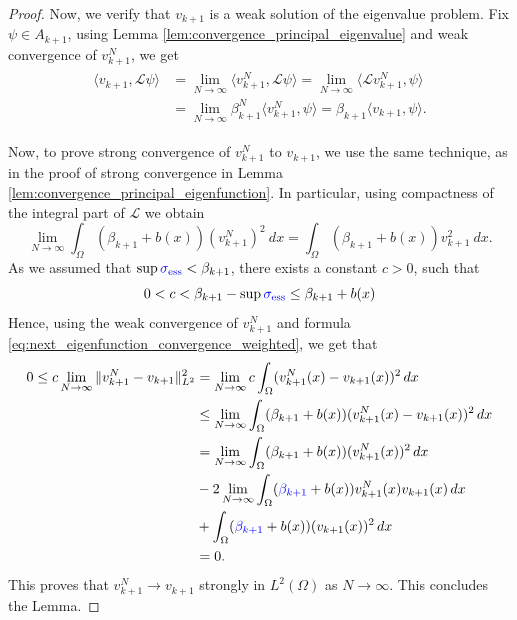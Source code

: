 \documentclass[12pt, a4paper]{article}
\newcommand{\revision}[1]{\textcolor{blue}{#1}}
\theoremstyle{break}
\theoremstyle{break}
\theoremstyle{break}
\theoremstyle{break}
\theoremstyle{break}
\theoremstyle{break}
\theoremstyle{break}
\theoremstyle{break}
\theoremstyle{break}
\begin{document}
\begin{proof}
    Now, we verify that $v_{k+1}$ is a weak solution of the eigenvalue problem. Fix $\psi \in A_{k+1}$, using Lemma \ref{lem:convergence_principal_eigenvalue} and weak convergence of $v_{k+1}^N$, we get
    \begin{align}
        \begin{split}
            \langle v_{k+1}, \mathcal{L} \psi \rangle
            &= \lim_{N \to \infty} \langle v_{k+1}^N, \mathcal{L} \psi \rangle = \lim_{N \to \infty} \langle \mathcal{L} v_{k+1}^N, \psi \rangle \\
            &= \lim_{N \to \infty} \beta_{k+1}^N \langle v_{k+1}^N, \psi \rangle = \beta_{k+1} \langle v_{k+1}, \psi \rangle.
        \end{split}
    \end{align}
    
    Now, to prove strong convergence of $v_{k+1}^N$ to $v_{k+1}$, we use the same technique, as in the proof of strong convergence in Lemma \ref{lem:convergence_principal_eigenfunction}. In particular, using compactness of the integral part of $\mathcal{L}$ we obtain
    \begin{equation}
        \label{eq:next_eigenfunction_convergence_weighted}
        \lim_{N \rightarrow \infty} \int_\Omega (\beta_{k+1} + b(x)) (v_{k+1}^N)^2\:dx = \int_\Omega (\beta_{k+1} + b(x))v_{k+1}^2\:dx.
    \end{equation}
    As we assumed that $\sup \revision{\sigma_{\mathrm{ess}}} < \beta_{k+1}$, there exists a constant $c > 0$, such that 
    \begin{equation}
        0 < c < \beta_{k+1} - \sup \revision{\sigma_{\mathrm{ess}}} \leq \beta_{k+1} + b(x)
    \end{equation}
    Hence, using the weak convergence of $v_{k+1}^N$ and formula \eqref{eq:next_eigenfunction_convergence_weighted}, we get that
    \begin{align}
        \begin{split}
            0 \leq c \lim_{N\rightarrow \infty}\|v_{k+1}^N - v_{k+1}\|_{L^2}^2 
            &= \lim_{N\rightarrow \infty} c \int_\Omega (v_{k+1}^N(x) - v_{k+1}(x))^2 \, dx \nonumber \\
            &\leq \lim_{N\rightarrow \infty} \int_\Omega (\beta_{k+1} + b(x))(v_{k+1}^N(x) - v_{k+1}(x))^2 \, dx \nonumber \\
            &= \lim_{N\rightarrow \infty} \int_\Omega (\beta_{k+1} + b(x))(v_{k+1}^N(x))^2 \, dx \nonumber \\
            &- 2 \lim_{N\rightarrow \infty} \int_\Omega (\revision{\beta_{k+1}} + b(x))v_{k+1}^N(x)v_{k+1}(x) \, dx \nonumber \\
            &+ \int_\Omega (\revision{\beta_{k+1}} + b(x))(v_{k+1}(x))^2 \, dx \\
            &= 0.
        \end{split}
    \end{align}
    This proves that $v_{k+1}^N \rightarrow v_{k+1}$ strongly in $L^2(\Omega)$ as $N \rightarrow \infty$. This concludes the Lemma.
\end{proof}
\end{document}
